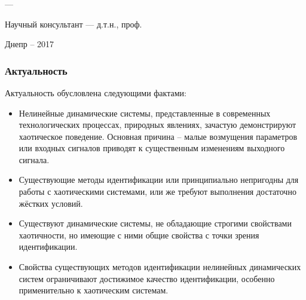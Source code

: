 \documentclass[10pt,utf8]{beamer}
\author{\dissauthorRu}
\title[Семинар -- 2017]{\booknameRu}
\begin{document}
\begin{frame}
  \frametitle{}
  \begin{center}
    {\Large \color{blue} \booknameRu}

    \vfill

    {\dissSpecId --- \dissSpecRu}

    \vfill

    {\large \dissauthorMain}

    \vfill

    Научный консультант --- д.т.н., проф. \superRu

    \vfill

    Днепр -- 2017
  \end{center}
\end{frame}


\begin{frame}
  \frametitle{Актуальность}

  Актуальность обусловлена следующими фактами:

  \begin{itemize}

    \item
      Нелинейные динамические системы, представленные в современных
      технологических процессах, природных явлениях, зачастую
      демонстрируют хаотическое поведение.
      Основная причина -- малые возмущения параметров или входных сигналов
      приводят к существенным изменениям выходного сигнала.

    \item
      Существующие методы идентификации или принципиально непригодны для
      работы с хаотическими системами, или же требуют выполнения
      достаточно жёстких условий.

    \item
      Существуют динамические системы, не обладающие строгими свойствами хаотичности,
      но имеющие с ними общие свойства с точки зрения идентификации.

    \item
      Свойства существующих методов идентификации нелинейных динамических систем
      ограничивают достижимое качество идентификации,
      особенно применительно к хаотическим системам.

  \end{itemize}


\end{frame}
\end{document}
